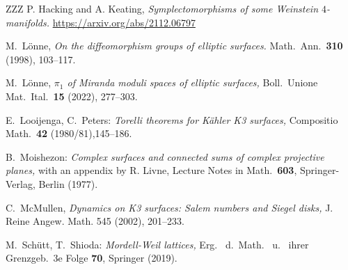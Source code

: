 \documentclass[10pt,letterpaper]{amsart}
\numberwithin{equation}{section}
\theoremstyle{remark}
\begin{document}
\begin{thebibliography}{ZZZ}
P. Hacking and A. Keating, 
\textit{Symplectomorphisms of some Weinstein $4$-manifolds.}
\url{https://arxiv.org/abs/2112.06797}


M.~L\"onne,
\textit{On the diffeomorphism groups of elliptic surfaces.}
 Math.\ Ann.\  \textbf{310} (1998), 103--117.

M.~L\"onne,
\textit{$\pi_1$ of Miranda moduli spaces of elliptic surfaces,}
Boll.~Unione Mat.~Ital.\ \textbf{15} (2022), 277--303.


E.~Looijenga, C.~Peters:
\textit{Torelli theorems for K\"ahler K3 surfaces,} 
Compositio Math.\ \textbf{42} (1980/81),145--186. 

B.~Moishezon:
\textsl{Complex surfaces and connected sums of complex projective planes,} 
with an appendix by R. Livne, Lecture Notes in Math.\  \textbf{603},  Springer-Verlag, Berlin (1977).

C.~McMullen, 
\textit{Dynamics on K3 surfaces: Salem numbers and Siegel disks,}
J. Reine Angew. Math. 545 (2002), 201--233.

M.~Sch\"utt, T.~Shioda:
\textsl{Mordell-Weil lattices,} 
Erg.~ d.~Math.~ u.~ ihrer Grenzgeb.\ 3e Folge  \textbf{70}, Springer (2019). 

\end{thebibliography}
\end{document}
